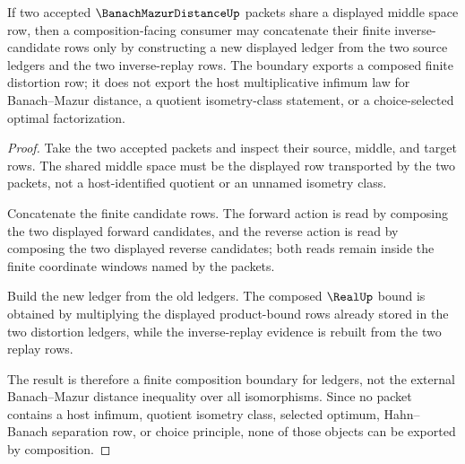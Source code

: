 \begin{theorem}
\label{thm:banach-mazur-distance-composition-boundary}
If two accepted $\BanachMazurDistanceUp$ packets share a displayed middle space row, then a composition-facing consumer may concatenate their finite inverse-candidate rows only by constructing a new displayed ledger from the two source ledgers and the two inverse-replay rows. The boundary exports a composed finite distortion row; it does not export the host multiplicative infimum law for Banach--Mazur distance, a quotient isometry-class statement, or a choice-selected optimal factorization.
\end{theorem}
\begin{proof}
Take the two accepted packets and inspect their source, middle, and target rows. The shared middle space must be the displayed row transported by the two packets, not a host-identified quotient or an unnamed isometry class.

Concatenate the finite candidate rows. The forward action is read by composing the two displayed forward candidates, and the reverse action is read by composing the two displayed reverse candidates; both reads remain inside the finite coordinate windows named by the packets.

Build the new ledger from the old ledgers. The composed $\RealUp$ bound is obtained by multiplying the displayed product-bound rows already stored in the two distortion ledgers, while the inverse-replay evidence is rebuilt from the two replay rows.

The result is therefore a finite composition boundary for ledgers, not the external Banach--Mazur distance inequality over all isomorphisms. Since no packet contains a host infimum, quotient isometry class, selected optimum, Hahn--Banach separation row, or choice principle, none of those objects can be exported by composition.
\end{proof}



